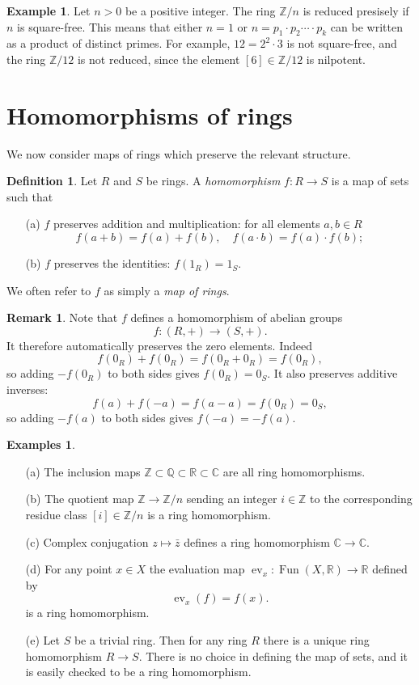 \documentclass [12pt,oneside,a4paper,mathscr]{amsart}
\theoremstyle{definition}
\newtheorem{defn}[thm]{Definition}
\newtheorem{remark}[thm]{Remark}
\newtheorem{example}[thm]{Example}
\newtheorem{examples}[thm]{Examples}
\newcommand {\C}{\mathbb C}
\newcommand{\Q}{\mathbb{Q}}
\newcommand{\R}{\mathbb{R}}
\newcommand{\Z}{\mathbb Z}
\newcommand{\Fun}{\operatorname{Fun}}
\newcommand{\ev}{\operatorname{ev}}
\begin{document}
\begin{example}
\label{sqfr}
Let $n>0$ be a positive integer. The ring $\Z/n$ is reduced presisely if $n$ is square-free. This means that either $n=1$ or $n=p_1\cdot p_2\cdots \cdot p_k$ can be written as a product of distinct primes.
For example, $12=2^2\cdot 3$ is not square-free, and  the ring $\Z/12$ is not reduced, since the element $[6]\in \Z/12$ is nilpotent.
\end{example}


\section{Homomorphisms of rings}
We now consider maps of rings which preserve the relevant structure.

\begin{defn}Let $R$ and $S$ be rings. A \emph{homomorphism} $f\colon R\to S$ is a map of sets such that
\begin{itemize}
\item[(a)] $f$ preserves addition and multiplication: for all elements $a,b\in R$
\[f(a+b)=f(a)+f(b), \quad f(a\cdot b)=f(a) \cdot f(b);\]
\item[(b)] $f$ preserves the identities: 
$ f(1_R)=1_S.$
\end{itemize}
\end{defn}

We often refer to $f$ as simply a \emph{map of rings}.
\begin{remark} Note that $f$ defines a homomorphism of abelian groups \[f\colon (R,+) \to (S,+).\] It therefore automatically preserves the zero elements. Indeed
\[f(0_R)+f(0_R)=f(0_R+0_R)=f(0_R) ,\]
so adding $-f(0_R)$ to both sides gives $f(0_R)=0_S$. It also preserves additive inverses:
\[f(a)+f(-a)=f(a-a)=f(0_R)=0_S,\]
so adding $-f(a)$ to both sides gives $f(-a)=-f(a)$.\end{remark}

\begin{examples}
\begin{itemize}
\item[(a)]The inclusion maps $\Z \subset \Q\subset \R \subset \C$ are all ring homomorphisms.
\smallskip
\item[(b)] The quotient map $\Z \to \Z/n$ sending an integer $i\in \Z$ to the corresponding residue class $[i]\in \Z/n$ is a ring homomorphism.
\smallskip
\item[(c)] Complex conjugation $z\mapsto \bar{z}$ defines a ring homomorphism $\C \to \C$.
\smallskip
\item[(d)] For any point $x\in X$ the evaluation map $\ev_x\colon \Fun(X,\R) \to \R$ defined by\[\ev_x(f) = f(x).\]
 is a ring homomorphism.
\smallskip
\item[(e)] Let $S$ be a trivial ring. Then for any ring $R$ there is a unique ring homomorphism $R \to S$. There is no choice in defining the map of sets, and it is easily checked to be a ring homomorphism.  
\end{itemize}
\end{examples}
\end{document}
